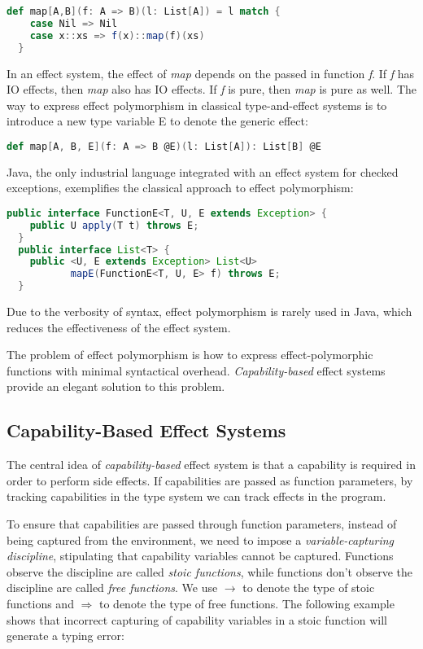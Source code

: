 \begin{lstlisting}[language=Scala]
  def map[A,B](f: A => B)(l: List[A]) = l match {
    case Nil => Nil
    case x::xs => f(x)::map(f)(xs)
  }
\end{lstlisting}

In an effect system, the effect of \emph{map} depends on the passed in
function \emph{f}. If \emph{f} has IO effects, then \emph{map} also
has IO effects. If \emph{f} is pure, then \emph{map} is pure as
well. The way to express effect polymorphism in classical
type-and-effect systems is to introduce a new type variable E to
denote the generic effect:

\begin{lstlisting}[language=Scala]
def map[A, B, E](f: A => B @E)(l: List[A]): List[B] @E
\end{lstlisting}

Java, the only industrial language integrated with an effect system
for checked exceptions, exemplifies the classical approach to effect
polymorphism:

\begin{lstlisting}[language=Java]
  public interface FunctionE<T, U, E extends Exception> {
    public U apply(T t) throws E;
  }
  public interface List<T> {
    public <U, E extends Exception> List<U>
           mapE(FunctionE<T, U, E> f) throws E;
  }
\end{lstlisting}

Due to the verbosity of syntax, effect polymorphism is rarely used in
Java, which reduces the effectiveness of the effect system.

The problem of effect polymorphism is how to express
effect-polymorphic functions with minimal syntactical overhead.
\emph{Capability-based} effect systems provide an elegant solution to
this problem.

\subsection{Capability-Based Effect Systems}

The central idea of \emph{capability-based} effect system is that a
capability is required in order to perform side effects. If
capabilities are passed as function parameters, by tracking
capabilities in the type system we can track effects in the program.

To ensure that capabilities are passed through function parameters,
instead of being captured from the environment, we need to impose a
\emph{variable-capturing discipline}, stipulating that capability
variables cannot be captured. Functions observe the discipline are
called \emph{stoic functions}, while functions don't observe the
discipline are called \emph{free functions}. We use $\to$ to denote
the type of stoic functions and $\Rightarrow$ to denote the type of
free functions. The following example shows that incorrect capturing
of capability variables in a stoic function will generate a typing
error:

